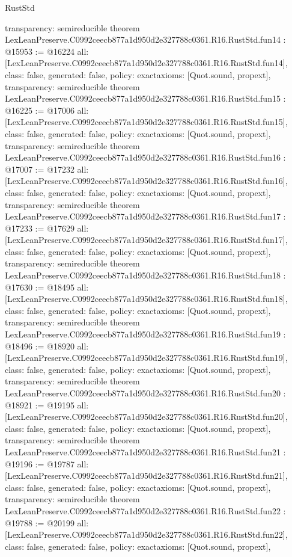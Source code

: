 \begin{lexlean}{RustStd}
\begin{coremodule}
{  transparency: semireducible
}
theorem LexLeanPreserve.C0992ceecb877a1d950d2e327788c0361.R16.RustStd.fun14 : @15953 := @16224 {
  all: [LexLeanPreserve.C0992ceecb877a1d950d2e327788c0361.R16.RustStd.fun14],
  class: false,
  generated: false,
  policy: exact{axioms: [Quot.sound, propext]},
  transparency: semireducible
}
theorem LexLeanPreserve.C0992ceecb877a1d950d2e327788c0361.R16.RustStd.fun15 : @16225 := @17006 {
  all: [LexLeanPreserve.C0992ceecb877a1d950d2e327788c0361.R16.RustStd.fun15],
  class: false,
  generated: false,
  policy: exact{axioms: [Quot.sound, propext]},
  transparency: semireducible
}
theorem LexLeanPreserve.C0992ceecb877a1d950d2e327788c0361.R16.RustStd.fun16 : @17007 := @17232 {
  all: [LexLeanPreserve.C0992ceecb877a1d950d2e327788c0361.R16.RustStd.fun16],
  class: false,
  generated: false,
  policy: exact{axioms: [Quot.sound, propext]},
  transparency: semireducible
}
theorem LexLeanPreserve.C0992ceecb877a1d950d2e327788c0361.R16.RustStd.fun17 : @17233 := @17629 {
  all: [LexLeanPreserve.C0992ceecb877a1d950d2e327788c0361.R16.RustStd.fun17],
  class: false,
  generated: false,
  policy: exact{axioms: [Quot.sound, propext]},
  transparency: semireducible
}
theorem LexLeanPreserve.C0992ceecb877a1d950d2e327788c0361.R16.RustStd.fun18 : @17630 := @18495 {
  all: [LexLeanPreserve.C0992ceecb877a1d950d2e327788c0361.R16.RustStd.fun18],
  class: false,
  generated: false,
  policy: exact{axioms: [Quot.sound, propext]},
  transparency: semireducible
}
theorem LexLeanPreserve.C0992ceecb877a1d950d2e327788c0361.R16.RustStd.fun19 : @18496 := @18920 {
  all: [LexLeanPreserve.C0992ceecb877a1d950d2e327788c0361.R16.RustStd.fun19],
  class: false,
  generated: false,
  policy: exact{axioms: [Quot.sound, propext]},
  transparency: semireducible
}
theorem LexLeanPreserve.C0992ceecb877a1d950d2e327788c0361.R16.RustStd.fun20 : @18921 := @19195 {
  all: [LexLeanPreserve.C0992ceecb877a1d950d2e327788c0361.R16.RustStd.fun20],
  class: false,
  generated: false,
  policy: exact{axioms: [Quot.sound, propext]},
  transparency: semireducible
}
theorem LexLeanPreserve.C0992ceecb877a1d950d2e327788c0361.R16.RustStd.fun21 : @19196 := @19787 {
  all: [LexLeanPreserve.C0992ceecb877a1d950d2e327788c0361.R16.RustStd.fun21],
  class: false,
  generated: false,
  policy: exact{axioms: [Quot.sound, propext]},
  transparency: semireducible
}
theorem LexLeanPreserve.C0992ceecb877a1d950d2e327788c0361.R16.RustStd.fun22 : @19788 := @20199 {
  all: [LexLeanPreserve.C0992ceecb877a1d950d2e327788c0361.R16.RustStd.fun22],
  class: false,
  generated: false,
  policy: exact{axioms: [Quot.sound, propext]},
}
\end{coremodule}
\end{lexlean}

